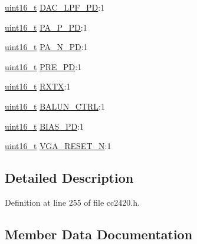 \begin{DoxyCompactItemize}
\item 
\hyperlink{_p_e___types_8h_a1f1825b69244eb3ad2c7165ddc99c956}{uint16\+\_\+t} \hyperlink{structcc2420___m_a_n_o_r__reg__t_af2b30b8e0a9431b35ab81312789efc70}{D\+A\+C\+\_\+\+L\+P\+F\+\_\+\+PD}\+:1
\item 
\hyperlink{_p_e___types_8h_a1f1825b69244eb3ad2c7165ddc99c956}{uint16\+\_\+t} \hyperlink{structcc2420___m_a_n_o_r__reg__t_abe09499b885a228f1bda42268dc1c0a3}{P\+A\+\_\+\+P\+\_\+\+PD}\+:1
\item 
\hyperlink{_p_e___types_8h_a1f1825b69244eb3ad2c7165ddc99c956}{uint16\+\_\+t} \hyperlink{structcc2420___m_a_n_o_r__reg__t_ac24ede00ee2c77b3b309dd67a5bdc300}{P\+A\+\_\+\+N\+\_\+\+PD}\+:1
\item 
\hyperlink{_p_e___types_8h_a1f1825b69244eb3ad2c7165ddc99c956}{uint16\+\_\+t} \hyperlink{structcc2420___m_a_n_o_r__reg__t_ab39ecc723b1dab02b89088434f965190}{P\+R\+E\+\_\+\+PD}\+:1
\item 
\hyperlink{_p_e___types_8h_a1f1825b69244eb3ad2c7165ddc99c956}{uint16\+\_\+t} \hyperlink{structcc2420___m_a_n_o_r__reg__t_a50f6670d2b50871e66d6f2f306f7da5a}{R\+X\+TX}\+:1
\item 
\hyperlink{_p_e___types_8h_a1f1825b69244eb3ad2c7165ddc99c956}{uint16\+\_\+t} \hyperlink{structcc2420___m_a_n_o_r__reg__t_ad711ca64f0198b1a1a107440c2491b54}{B\+A\+L\+U\+N\+\_\+\+C\+T\+RL}\+:1
\item 
\hyperlink{_p_e___types_8h_a1f1825b69244eb3ad2c7165ddc99c956}{uint16\+\_\+t} \hyperlink{structcc2420___m_a_n_o_r__reg__t_a24a4bde831f3b54ca96f9b4fdbf0316f}{B\+I\+A\+S\+\_\+\+PD}\+:1
\item 
\hyperlink{_p_e___types_8h_a1f1825b69244eb3ad2c7165ddc99c956}{uint16\+\_\+t} \hyperlink{structcc2420___m_a_n_o_r__reg__t_a4e0e10265ff3497ae4adc09c86cb74ae}{V\+G\+A\+\_\+\+R\+E\+S\+E\+T\+\_\+N}\+:1
\end{DoxyCompactItemize}


\subsection{Detailed Description}


Definition at line 255 of file cc2420.\+h.



\subsection{Member Data Documentation}
